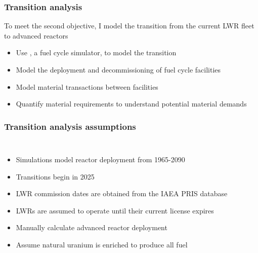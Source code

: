 \begin{frame}
    \frametitle{Transition analysis}
    To meet the second objective, I model the transition from the current 
    \gls{LWR} fleet to advanced reactors
    \begin{itemize}
        \item<2-> Use \Cyclus \cite{huff_fundamental_2016}, 
              a fuel cycle simulator, to model the transition
        \item<3-> Model the deployment and decommissioning of fuel cycle facilities 
        \item<3-> Model material transactions between facilities
        \item<4-> Quantify material requirements to understand potential material
              demands
    \end{itemize}

\end{frame}

\begin{frame}
    \frametitle{Transition analysis assumptions}
    \begin{columns}
        
    \column[t]{6cm}
    \vspace{-0.9cm}
    

        \column[t]{4.5cm}
        \begin{itemize}
            \item Simulations model reactor deployment from 1965-2090
            \item Transitions begin in 2025
            \item<2-> \gls{LWR} commission dates are obtained from the IAEA PRIS
                database \cite{noauthor_power_1989}
            \item<2-> \glspl{LWR} are assumed to operate until their current license 
                expires
            \item<3-> Manually calculate advanced reactor deployment
            \item<3-> Assume natural uranium is enriched to produce all 
                  fuel
        \end{itemize}

\end{columns}
\end{frame}

